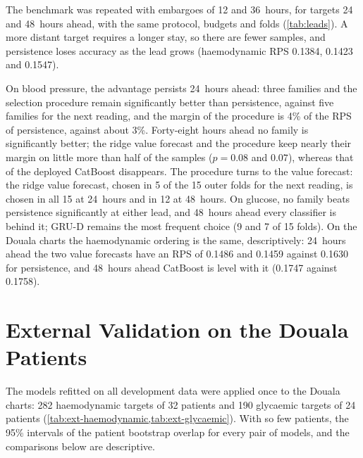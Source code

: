 The benchmark was repeated with embargoes of 12 and 36~hours, for targets 24 and 48~hours ahead, with the same protocol, budgets and folds (\cref{tab:leads}). A more distant target requires a longer stay, so there are fewer samples, and persistence loses accuracy as the lead grows (haemodynamic RPS 0.1384, 0.1423 and 0.1547).



On blood pressure, the advantage persists 24~hours ahead: three families and the selection procedure remain significantly better than persistence, against five families for the next reading, and the margin of the procedure is 4\% of the RPS of persistence, against about 3\%. Forty-eight hours ahead no family is significantly better; the ridge value forecast and the procedure keep nearly their margin on little more than half of the samples ($p = 0.08$ and $0.07$), whereas that of the deployed CatBoost disappears. The procedure turns to the value forecast: the ridge value forecast, chosen in 5 of the 15 outer folds for the next reading, is chosen in all 15 at 24~hours and in 12 at 48~hours. On glucose, no family beats persistence significantly at either lead, and 48~hours ahead every classifier is behind it; GRU-D remains the most frequent choice (9 and 7 of 15 folds). On the Douala charts the haemodynamic ordering is the same, descriptively: 24~hours ahead the two value forecasts have an RPS of 0.1486 and 0.1459 against 0.1630 for persistence, and 48~hours ahead CatBoost is level with it (0.1747 against 0.1758).

\section{External Validation on the Douala Patients}\label{sec:results-external}

The models refitted on all development data were applied once to the Douala charts: 282 haemodynamic targets of 32 patients and 190 glycaemic targets of 24 patients (\cref{tab:ext-haemodynamic,tab:ext-glycaemic}). With so few patients, the 95\% intervals of the patient bootstrap overlap for every pair of models, and the comparisons below are descriptive.




